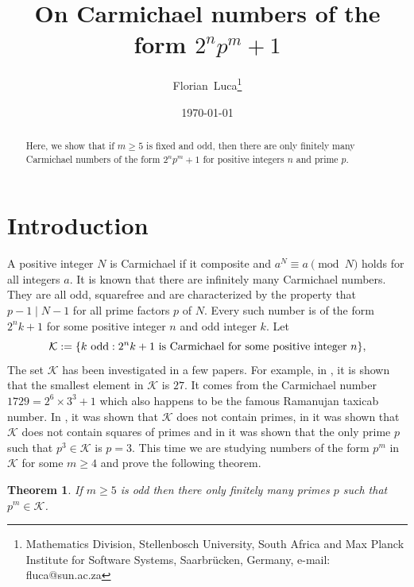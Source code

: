 \documentclass[11pt]{article}
\newtheorem{theorem}[thm]{Theorem}
\begin{document}
\title{On Carmichael numbers of the form $2^np^m+1$}

\date{\today}


\author{Florian~Luca\footnote{Mathematics Division, Stellenbosch University, South Africa and Max Planck Institute for Software Systems, Saarbr\"ucken, Germany, e-mail: fluca@sun.ac.za}}


\maketitle


\begin{abstract}
Here, we show that if $m\ge 5$ is fixed and odd, then there are only finitely many Carmichael numbers of the form $2^np^m+1$ for positive integers $n$ and prime $p$. 
\end{abstract}

\section{Introduction}



A positive integer $N$ is Carmichael if it composite and $a^N\equiv a\pmod N$ holds for all integers $a$. It is known that there are infinitely many Carmichael numbers. They are all odd, squarefree and are characterized by  the property that $p-1\mid N-1$ for all prime factors $p$ of $N$. Every such number is of the form $2^nk+1$ for some positive integer $n$ and odd integer $k$. Let
$$
{\mathcal K}:=\{k~{\text{\rm odd}}: 2^nk+1~{\text{\rm is~Carmichael~for~some~positive~integer}}~n\},
$$
The set ${\mathcal K}$ has been investigated in a few papers. For example, in \cite{CLP}, it is shown that the smallest element in ${\mathcal K}$ is $27$. It comes from the Carmichael number $1729=2^6\times 3^3+1$ which also happens to be the famous Ramanujan taxicab number. In \cite{AL}, it was shown that ${\mathcal K}$ does not contain primes, in \cite{LR} it was shown that ${\mathcal K}$ does not contain squares of primes and in \cite{L1} 
it was shown that the only prime $p$ such that $p^3\in {\mathcal K}$ is $p=3$.  
This time we are studying numbers of the form $p^m$ in ${\mathcal K}$ for some $m\ge 4$ and prove the following theorem.

\begin{theorem}
\label{thm:1}
If $m\ge 5$ is odd then there only finitely many primes $p$ such that $p^m\in {\mathcal K}$. 
\end{theorem}
\end{document}
